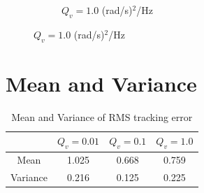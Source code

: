 \documentclass[paper=a4, fontsize=11pt]{scrartcl} %
\numberwithin{equation}{section} %
\numberwithin{figure}{section} %
\numberwithin{table}{section} %
\begin{document}
\begin{figure}[H]
	\begin{subfigure}[b]{0.3\textwidth}
		\noindent{}
	\caption{$Q_v = 1.0$ (rad/s)$^2$/Hz}
	\end{subfigure}
\end{figure} 

\vspace{10mm}

\section*{Mean and Variance}

\vspace{-5mm}
\begin{table}[H]
\caption*{Mean and Variance of RMS tracking error}
\vspace{3mm}
\centering
\begin{tabular}{| c | c | c | c | }
\hline
			& $Q_v = 0.01$ 	& $Q_v = 0.1$ 	& $Q_v = 1.0$ 	\\
\hline 
Mean		& 1.025	  	 	& 0.668 		& 0.759			\\
\hline							
Variance	& 0.216			& 0.125 		& 0.225			\\	
\hline							
\end{tabular}
\end{table}
\end{document}
